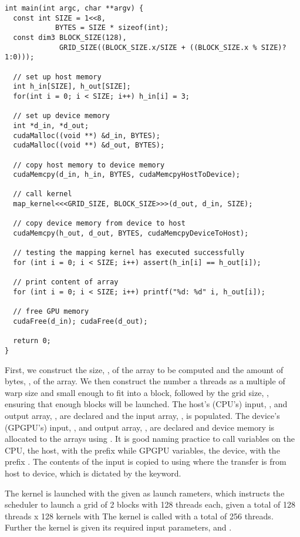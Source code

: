 \begin{lstlisting}[caption={Calling a kernel}, label={lst:kernel call example}]
int main(int argc, char **argv) {
  const int SIZE = 1<<8,
            BYTES = SIZE * sizeof(int);
  const dim3 BLOCK_SIZE(128),
             GRID_SIZE((BLOCK_SIZE.x/SIZE + ((BLOCK_SIZE.x % SIZE)?1:0)));

  // set up host memory
  int h_in[SIZE], h_out[SIZE];
  for(int i = 0; i < SIZE; i++) h_in[i] = 3;

  // set up device memory
  int *d_in, *d_out;
  cudaMalloc((void **) &d_in, BYTES);
  cudaMalloc((void **) &d_out, BYTES);

  // copy host memory to device memory
  cudaMemcpy(d_in, h_in, BYTES, cudaMemcpyHostToDevice);

  // call kernel
  map_kernel<<<GRID_SIZE, BLOCK_SIZE>>>(d_out, d_in, SIZE);

  // copy device memory from device to host
  cudaMemcpy(h_out, d_out, BYTES, cudaMemcpyDeviceToHost);

  // testing the mapping kernel has executed successfully
  for (int i = 0; i < SIZE; i++) assert(h_in[i] == h_out[i]);

  // print content of array
  for (int i = 0; i < SIZE; i++) printf("%d: %d" i, h_out[i]);

  // free GPU memory
  cudaFree(d_in); cudaFree(d_out);

  return 0;
}
\end{lstlisting}

First, we construct the size, , of the array to be computed and the amount of bytes, , of the array.
We then construct the number a threads as a multiple of warp size and small enough to fit into a block, followed by the grid size, , ensuring that enough blocks will be launched.
The host's (CPU's) input, , and output array, , are declared and the input array, , is populated.
The device's (GPGPU's) input, , and output array, , are declared and device memory is allocated to the arrays using .
It is good naming practice to call variables on the CPU, the host, with the prefix  while GPGPU variables, the device, with the prefix .
The contents of the input is copied to  using  where the transfer is from host to device, which is dictated by the  keyword.

The kernel is launched with the  given as launch rameters, which instructs the scheduler to launch a grid of 2 blocks with 128 threads each, given a total of 128 threads x 128 kernels with The kernel is called with a total of 256 threads.
Further the kernel is given its required input parameters,  and .

